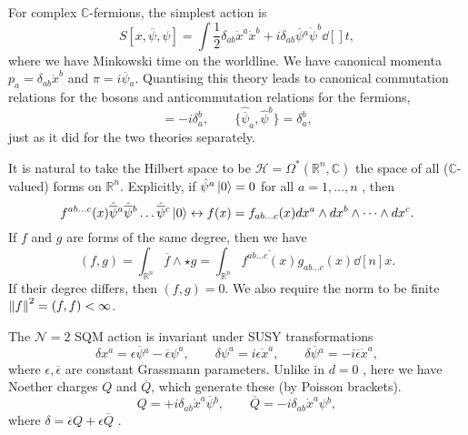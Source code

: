 For complex $\mathbb{C}$-fermions, the simplest action is
\begin{equation}
  S[x, \overline{\psi}{}, \psi] = \int \frac{1}{2} \delta_{ab} \dot{x}^a \dot{x}^b + i \delta_{ab} \overline{\psi}{}^a \dot{\psi}^b \dd[]{t},
\end{equation}
where we have Minkowski time on the worldline.
We have canonical momenta $p_a = \delta_{ab} \dot{x}^b$ and $\pi = i \overline{\psi}{}_a$.
Quantising this theory leads to canonical commutation relations for the bosons and anticommutation relations for the fermions, 
\begin{equation}
  [\hat{p}_a, \hat{x}^b] = -i \delta^b_a, \qquad \{\hat{\overline{\psi}{}}_a, \hat{\psi}^b\} = \delta_a^b,
\end{equation}
just as it did for the two theories separately.

It is natural to take the Hilbert space to be $\mathcal{H} = \Omega^*(\mathbb{R}^n, \mathbb{C})$ the space of all ($\mathbb{C}$-valued) forms on $\mathbb{R}^n$. Explicitly, if $\hat{\psi}^a \ket{0} = 0$  for all $a = 1, \dots, n$ , then
\begin{equation}
  f^{ab \dots c} (x) \hat{\overline{\psi}{}}{}^a \hat{\overline{\psi}{}}{}^b \dots \hat{\overline{\psi}{}}{}^c \ket{0} \leftrightarrow f(x) = f_{ab \dots c} (x) dx^a \wedge dx^b \wedge \dots \wedge dx^c.
\end{equation}
If $f$ and $g$ are forms of the same degree, then we have
\begin{equation}
  (f, g) = 
  \int_{\mathbb{R}^n} \overline{f}{} \wedge \star g = \int_{\mathbb{R}^n} \overline{f^{ab \dots c} (x)}{} g_{ab \dots c} (x) \dd[n]{x}.
\end{equation}
If their degree differs, then $(f, g) = 0$.
We also require the norm to be finite $ \norm{f}^2 = (f, f) < \infty$.

The $\mathcal{N} = 2$ SQM action is invariant under SUSY transformations
\begin{equation}
  \delta x^a = \epsilon \overline{\psi}{}^a - \overline{\epsilon}{} \psi^a, \qquad \delta \psi^a = i \epsilon \dot{x}^a, \qquad \delta \overline{\psi}{}^a = -i \overline{\epsilon}{} \dot{x}^a,
\end{equation}
where $\epsilon, \overline{\epsilon}{}$  are constant Grassmann parameters. Unlike in $d = 0$ , here we have Noether charges $Q$  and $\overline{Q}{}$, which generate these (by Poisson brackets).
\begin{equation}
  Q = +i \delta_{ab} \dot{x}^a \overline{\psi}{}^b, \qquad
  \overline{Q}{} = -i \delta_{ab} \dot{x}^a {\psi}{}^b,
\end{equation}
where $\delta = \overline{\epsilon}{} Q + \epsilon \overline{Q}{}$ .

